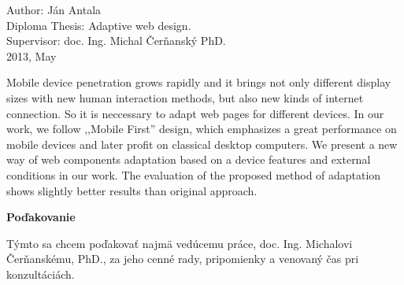 Author: Ján Antala\\
Diploma Thesis: Adaptive web design. \\
Supervisor: doc. Ing. Michal Čerňanský PhD. \\
2013, May
\newline

Mobile device penetration grows rapidly and it brings not only different display sizes with new human interaction methods, but also new kinds of internet connection. So it is neccessary to adapt web pages for different devices.
In our work, we follow ,,Mobile First'' design, which emphasizes a great performance on mobile devices and later profit on classical desktop computers. We present a new way of web components adaptation based on a device features and external conditions in our work.
The evaluation of the proposed method of adaptation shows slightly better results than original approach.



\pagebreak
\thispagestyle{empty}
\bigskip\vfil
 \noindent\textbf{Poďakovanie}
\bigskip

Týmto sa chcem poďakovať najmä vedúcemu práce, doc. Ing. Michalovi Čerňanskému, PhD.,
za jeho cenné rady, pripomienky a venovaný čas pri konzultáciách.
\pagebreak

\newpage
\setcounter{page}{1}
\thispagestyle{empty}
\setcounter{tocdepth}{3}
\tableofcontents %
\newpage 
\thispagestyle{empty}
\newpage
\thispagestyle{empty}
\listoffigures 
\newpage